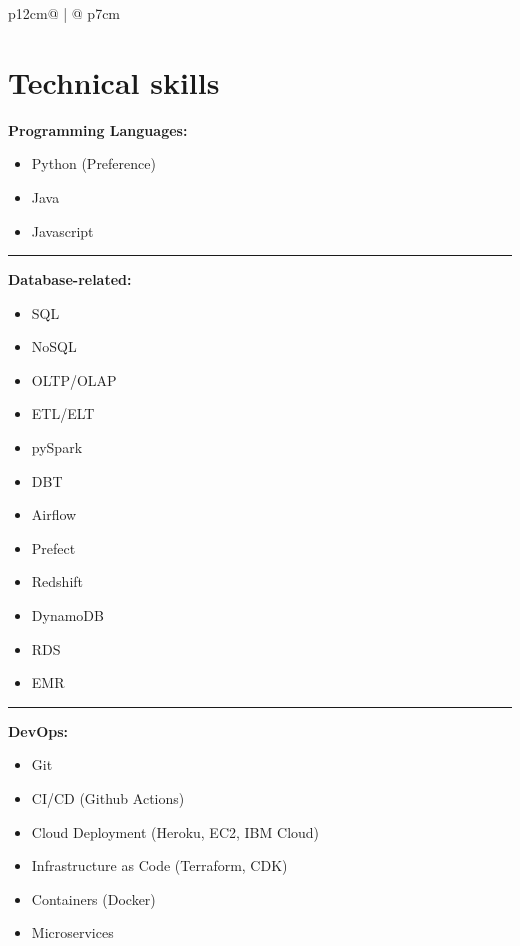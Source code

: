 \documentclass[letterpaper, 11pt]{article}
\begin{document}
\begin{tabular}{p{12cm}@{\hspace{1em}} | @{\hspace{1em}} p{7cm}}
    \section*{Technical skills}
        {\large\textbf{Programming Languages:}}
        \begin{itemize}    
            \item Python (Preference)
            \item Java
            \item Javascript
        \end{itemize}
        
        {\color{lightgray}\rule{\linewidth}{1pt}}
        
        \vspace{10pt}
        {\large\textbf{Database-related:}}
            \begin{multicols}{2}
                \begin{itemize}
                    \item SQL
                    \item NoSQL
                    \item OLTP/OLAP
                    \item ETL/ELT
                    \item pySpark
                    \item DBT
                    \item Airflow
                    \item Prefect
                    \item Redshift                        
                    \item DynamoDB
                    \item RDS
                    \item EMR
                \end{itemize}
            \end{multicols}
            
        {\color{lightgray}\rule{\linewidth}{1pt}}
        
        \vspace{10pt}
        {\large\textbf{DevOps:}}    
            \begin{itemize}
                \item Git
                \item CI/CD (Github Actions)
                \item Cloud Deployment (Heroku, EC2, IBM Cloud)
                \item Infrastructure as Code (Terraform, CDK)
                \item Containers (Docker)
                \item Microservices
            \end{itemize}
            \vspace{8pt}

\end{tabular}
\end{document}
